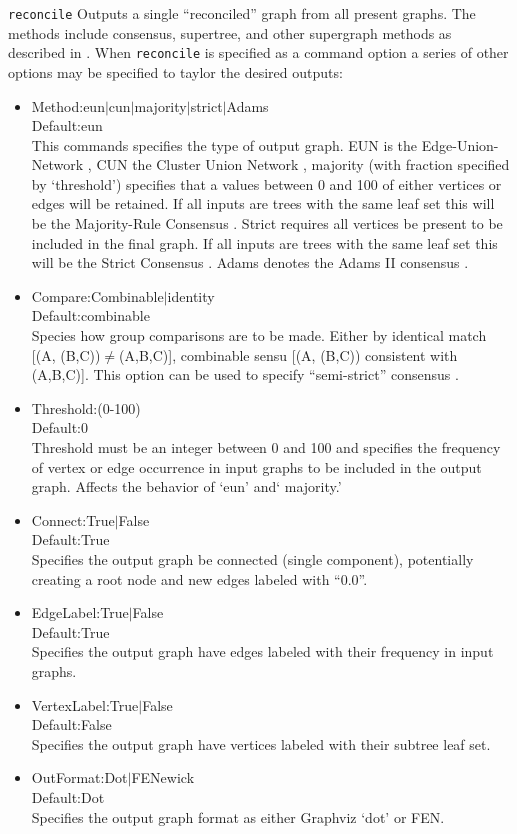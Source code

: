 \documentclass[11pt]{article}
\begin{document}
				\smallskip
				\noindent \texttt{reconcile} Outputs  a single ``reconciled'' graph from all present graphs.  The methods include consensus, supertree, and other supergraph methods as described in \cite{Wheeler2012, Wheeler2021a}.  When \texttt{reconcile} is specified as a command option a series of  other options may be specified to taylor the desired outputs:
					\begin{itemize}
							\item {Method:eun$\mid$cun$\mid$majority$\mid$strict$\mid$Adams\\Default:eun\\This commands specifies the type of output graph.
							EUN is the Edge-Union-Network \citep{MiyagiandWheeler2019}, CUN the Cluster Union Network \citep{Baroni2005},
							majority (with fraction specified by `threshold') specifies that a values between 0 and 100 of either vertices or edges will be retained.  If all inputs are trees with the same leaf set this will be the Majority-Rule Consensus \citep{MargushandMcMorris1981}.
							Strict requires all vertices be present to be included in the final graph.  If all inputs are trees with the same leaf set this will be the Strict Consensus \citep{Schuhandpolhemus1980}. Adams denotes the Adams II consensus \citep{Adams1972}.}
						\item{Compare:Combinable$\mid$identity\\Default:combinable\\Species how group comparisons are to be made.  Either by identical match [(A, (B,C))$\neq$(A,B,C)],
							combinable sensu \cite{Nelson1979} [(A, (B,C)) consistent with (A,B,C)].  This option can be used to specify ``semi-strict'' consensus
							\citep{Bremer1990}.
						}
						\item{Threshold:(0-100)\\Default:0\\Threshold must be an integer between 0 and 100 and specifies the frequency of vertex or edge occurrence in input graphs to be included in the output graph.  Affects the behavior of `eun' and` majority.'
						}
						\item{Connect:True$\mid$False\\Default:True\\Specifies the output graph be connected (single component), potentially creating a root node and new edges labeled with ``0.0''.
						}
						\item{EdgeLabel:True$\mid$False\\Default:True\\Specifies the output graph have edges labeled with their frequency in input graphs.
						}
						\item{VertexLabel:True$\mid$False\\Default:False\\Specifies the output graph have vertices labeled with their subtree leaf set.
						}
						\item{OutFormat:Dot$\mid$FENewick\\Default:Dot\\Specifies the output graph format as either Graphviz `dot' or FEN.
						}
						\end{itemize}	
				
\end{document}
